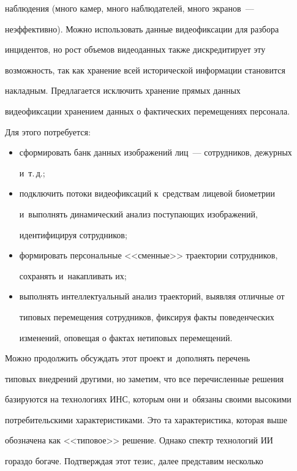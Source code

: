 наблюдения (много камер, много наблюдателей, много экранов~--- 

неэффективно). Можно использовать данные видеофиксации для разбора 

инцидентов, но рост объемов видеоданных также дискредитирует эту 

возможность, так как хранение всей исторической информации становится 

накладным. Предлагается исключить хранение прямых данных 

видеофиксации хранением данных о фактических перемещениях персонала. 

Для этого потребуется:

     \begin{itemize}

\item сформировать банк данных изображений лиц~--- сотрудников, дежурных 

и~т.\,д.;

\item подключить потоки видеофиксаций к~средствам лицевой биометрии 

и~выполнять динамический анализ поступающих изображений, 

идентифицируя сотрудников;

\item формировать персональные <<сменные>> траектории сотрудников, 

сохранять и~накапливать их;

\item выполнять интеллектуальный анализ траекторий, выявляя отличные от 

типовых перемещения сотрудников, фиксируя факты поведенческих 

изменений, оповещая о фактах нетиповых перемещений.

\end{itemize}

     

     Можно продолжить обсуждать этот проект и~дополнять перечень 

типовых внедрений другими, но заметим, что все перечисленные решения 

базируются на технологиях ИНС, которым они и~обязаны своими высокими 

потребительскими характеристиками. Это та характеристика, которая выше 

обозначена как <<типовое>> решение. Однако спектр технологий ИИ 

гораздо богаче. Подтверждая этот тезис, далее представим несколько 

